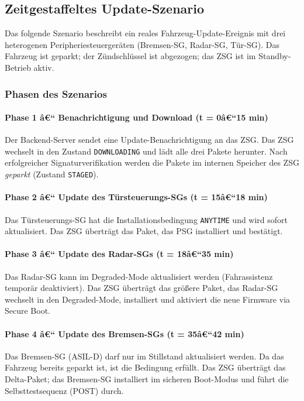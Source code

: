 ﻿\documentclass[12pt,a4paper,twoside]{article}
\begin{document}
\subsection{Zeitgestaffeltes Update-Szenario}
\label{subsec:zeitgestaffelt}

Das folgende Szenario beschreibt ein reales Fahrzeug-Update-Ereignis mit
drei heterogenen Peripheriesteuergeräten (Bremsen-SG, Radar-SG, Tür-SG).
Das Fahrzeug ist geparkt; der Zündschlüssel ist abgezogen; das ZSG ist
im Standby-Betrieb aktiv.

\subsubsection{Phasen des Szenarios}

\paragraph{Phase 1 â€“ Benachrichtigung und Download (t = 0â€“15 min)}
Der Backend-Server sendet eine Update-Benachrichtigung an das ZSG.
Das ZSG wechselt in den Zustand \texttt{DOWNLOADING} und lädt alle drei
Pakete herunter. Nach erfolgreicher Signaturverifikation werden die Pakete
im internen Speicher des ZSG \emph{geparkt} (Zustand \texttt{STAGED}).

\paragraph{Phase 2 â€“ Update des Türsteuerungs-SGs (t = 15â€“18 min)}
Das Türsteuerungs-SG hat die Installationsbedingung \texttt{ANYTIME}
und wird sofort aktualisiert. Das ZSG überträgt das Paket, das PSG
installiert und bestätigt.

\paragraph{Phase 3 â€“ Update des Radar-SGs (t = 18â€“35 min)}
Das Radar-SG kann im Degraded-Mode aktualisiert werden (Fahrassistenz
temporär deaktiviert). Das ZSG überträgt das größere Paket, das
Radar-SG wechselt in den Degraded-Mode, installiert und aktiviert die
neue Firmware via Secure Boot.

\paragraph{Phase 4 â€“ Update des Bremsen-SGs (t = 35â€“42 min)}
Das Bremsen-SG (ASIL-D) darf nur im Stillstand aktualisiert werden.
Da das Fahrzeug bereits geparkt ist, ist die Bedingung erfüllt. Das ZSG
überträgt das Delta-Paket; das Bremsen-SG installiert im sicheren
Boot-Modus und führt die Selbsttestsequenz (POST) durch.
\end{document}
